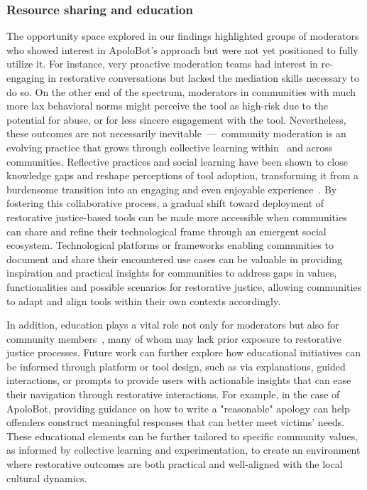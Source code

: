 \subsubsection{Resource sharing and education}
The opportunity space explored in our findings highlighted groups of moderators who showed interest in ApoloBot's approach but were not yet positioned to fully utilize it. For instance, very proactive moderation teams had interest in re-engaging in restorative conversations but lacked the mediation skills necessary to do so. On the other end of the spectrum, moderators in communities with much more lax behavioral norms might perceive the tool as high-risk due to the potential for abuse, or for less sincere engagement with the tool.
Nevertheless, these outcomes are not necessarily inevitable~---~community moderation is an evolving practice that grows through collective learning within~\cite{Cullen2022} and across~\cite{Hwang2024, Uttarapong2024} communities. Reflective practices and social learning have been shown to close knowledge gaps and reshape perceptions of tool adoption, transforming it from a burdensome transition into an engaging and even enjoyable experience~\cite{Hwang2024}. By fostering this collaborative process, a gradual shift toward deployment of restorative justice-based tools can be made more accessible when communities can share and refine their technological frame through an emergent social ecosystem. Technological platforms or frameworks enabling communities to document and share their encountered use cases can be valuable in providing inspiration and practical insights for communities to address gaps in values, functionalities and possible scenarios for restorative justice, allowing communities to adapt and align tools within their own contexts accordingly.

In addition, education plays a vital role not only for moderators but also for community members~\cite{West2018}, many of whom may lack prior exposure to restorative justice processes. Future work can further explore how educational initiatives can be informed through platform or tool design, such as via explanations, guided interactions, or prompts to provide users with actionable insights that can ease their navigation through restorative interactions. For example, in the case of ApoloBot, providing guidance on how to write a "reasonable" apology can help offenders construct meaningful responses that can better meet victims' needs. These educational elements can be further tailored to specific community values, as informed by collective learning and experimentation, to create an environment where restorative outcomes are both practical and well-aligned with the local cultural dynamics.


